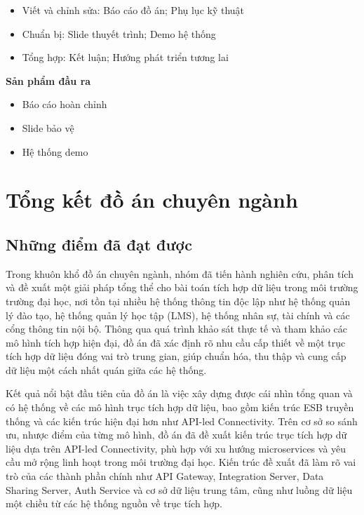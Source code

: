 \begin{itemize}
    \item Viết và chỉnh sửa: Báo cáo đồ án; Phụ lục kỹ thuật
    \item Chuẩn bị: Slide thuyết trình; Demo hệ thống
    \item Tổng hợp: Kết luận; Hướng phát triển tương lai
\end{itemize}


\textbf{Sản phẩm đầu ra}
\begin{itemize}
    \item Báo cáo hoàn chỉnh
    \item Slide bảo vệ
    \item Hệ thống demo
\end{itemize}

\chapter{Tổng kết đồ án chuyên ngành}

\section{Những điểm đã đạt được}

Trong khuôn khổ đồ án chuyên ngành, nhóm đã tiến hành nghiên cứu, phân tích và đề xuất một giải pháp tổng thể cho bài toán tích hợp dữ liệu trong môi trường trường đại học, nơi tồn tại nhiều hệ thống thông tin độc lập như hệ thống quản lý đào tạo, hệ thống quản lý học tập (LMS), hệ thống nhân sự, tài chính và các cổng thông tin nội bộ. Thông qua quá trình khảo sát thực tế và tham khảo các mô hình tích hợp hiện đại, đồ án đã xác định rõ nhu cầu cấp thiết về một trục tích hợp dữ liệu đóng vai trò trung gian, giúp chuẩn hóa, thu thập và cung cấp dữ liệu một cách nhất quán giữa các hệ thống.

Kết quả nổi bật đầu tiên của đồ án là việc xây dựng được cái nhìn tổng quan và có hệ thống về các mô hình trục tích hợp dữ liệu, bao gồm kiến trúc ESB truyền thống và các kiến trúc hiện đại hơn như API-led Connectivity. Trên cơ sở so sánh ưu, nhược điểm của từng mô hình, đồ án đã đề xuất kiến trúc trục tích hợp dữ liệu dựa trên API-led Connectivity, phù hợp với xu hướng microservices và yêu cầu mở rộng linh hoạt trong môi trường đại học. Kiến trúc đề xuất đã làm rõ vai trò của các thành phần chính như API Gateway, Integration Server, Data Sharing Server, Auth Service và cơ sở dữ liệu trung tâm, cũng như luồng dữ liệu một chiều từ các hệ thống nguồn về trục tích hợp.


